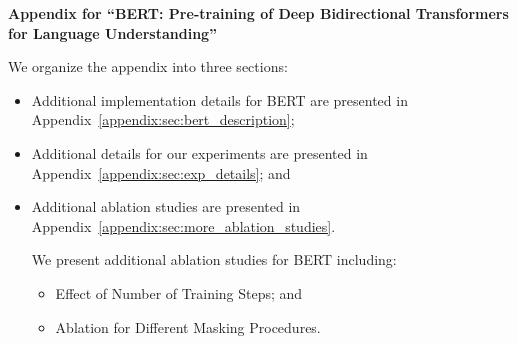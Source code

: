 \begin{center}
{\bf \large{
    Appendix for ``BERT: Pre-training of Deep Bidirectional Transformers for Language Understanding''}}
\end{center}


We organize the appendix into three sections:
\begin{itemize}
   \item Additional implementation details for BERT are presented in Appendix~\ref{appendix:sec:bert_description};
   
   \item Additional details for our experiments are presented in Appendix~\ref{appendix:sec:exp_details}; and
   
   
   \item Additional ablation studies are presented in Appendix~\ref{appendix:sec:more_ablation_studies}.
   
   We present additional ablation studies for BERT including:
   \begin{itemize}
      \item Effect of Number of Training Steps; and
      \item Ablation for Different Masking Procedures.
   \end{itemize}
\end{itemize}





